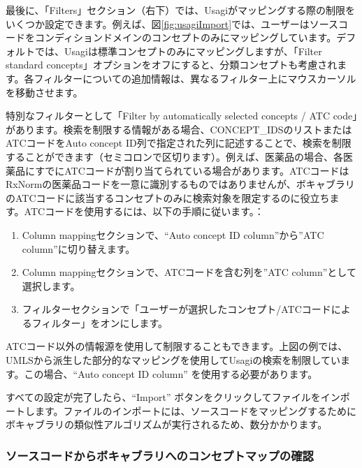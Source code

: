 \documentclass[
  11pt]{book}
\providecommand{\tightlist}{%
  \setlength{\itemsep}{0pt}\setlength{\parskip}{0pt}}
\theoremstyle{definition}
\theoremstyle{definition}
\theoremstyle{definition}
\theoremstyle{definition}
\theoremstyle{remark}
\begin{document}
最後に、「Filters」セクション（右下）では、Usagiがマッピングする際の制限をいくつか設定できます。例えば、図\ref{fig:usagiImport}では、ユーザーはソースコードをコンディションドメインのコンセプトのみにマッピングしています。デフォルトでは、Usagiは標準コンセプトのみにマッピングしますが、「Filter standard concepts」オプションをオフにすると、分類コンセプトも考慮されます。各フィルターについての追加情報は、異なるフィルター上にマウスカーソルを移動させます。

特別なフィルターとして「Filter by automatically selected concepts / ATC code」があります。検索を制限する情報がある場合、CONCEPT\_IDSのリストまたはATCコードをAuto concept ID列で指定された列に記述することで、検索を制限することができます（セミコロンで区切ります）。例えば、医薬品の場合、各医薬品にすでにATCコードが割り当てられている場合があります。ATCコードはRxNormの医薬品コードを一意に識別するものではありませんが、ボキャブラリのATCコードに該当するコンセプトのみに検索対象を限定するのに役立ちます。ATCコードを使用するには、以下の手順に従います。：

\begin{enumerate}
\def\labelenumi{\arabic{enumi}.}
\tightlist
\item
  Column mappingセクションで、``Auto concept ID column''から''ATC column''に切り替えます。
\item
  Column mappingセクションで、ATCコードを含む列を''ATC column''として選択します。
\item
  フィルターセクションで「ユーザーが選択したコンセプト/ATCコードによるフィルター」をオンにします。
\end{enumerate}

ATCコード以外の情報源を使用して制限することもできます。上図の例では、UMLSから派生した部分的なマッピングを使用してUsagiの検索を制限しています。この場合、``Auto concept ID column'' を使用する必要があります。

すべての設定が完了したら、``Import'' ボタンをクリックしてファイルをインポートします。ファイルのインポートには、ソースコードをマッピングするためにボキャブラリの類似性アルゴリズムが実行されるため、数分かかります。

\subsubsection*{ソースコードからボキャブラリへのコンセプトマップの確認}\label{ux30bdux30fcux30b9ux30b3ux30fcux30c9ux304bux3089ux30dcux30adux30e3ux30d6ux30e9ux30eaux3078ux306eux30b3ux30f3ux30bbux30d7ux30c8ux30deux30c3ux30d7ux306eux78baux8a8d}
\end{document}

